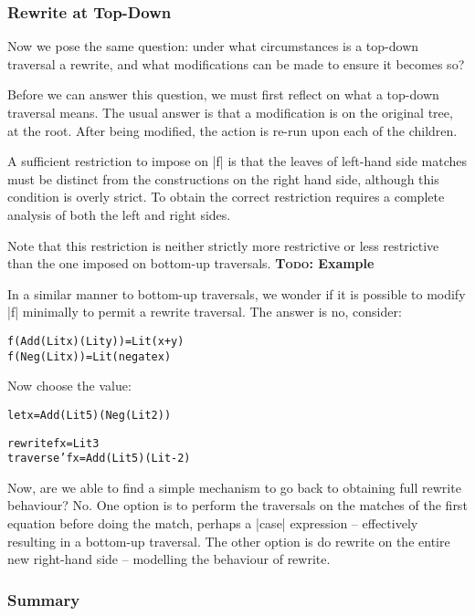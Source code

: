\documentclass[preprint]{sigplanconf}
\newcommand{\todo}[1]{\textbf{\textsc{Todo:} #1}}
\newenvironment{code}{\begin{alltt}\small}{\end{alltt}}
\begin{document}
\subsubsection{Rewrite at Top-Down}

Now we pose the same question: under what circumstances is a top-down traversal a rewrite, and what modifications can be made to ensure it becomes so?

Before we can answer this question, we must first reflect on what a top-down traversal means. The usual answer is that a modification is on the original tree, at the root. After being modified, the action is re-run upon each of the children.

A sufficient restriction to impose on |f| is that the leaves of left-hand side matches must be distinct from the constructions on the right hand side, although this condition is overly strict. To obtain the correct restriction requires a complete analysis of both the left and right sides.

Note that this restriction is neither strictly more restrictive or less restrictive than the one imposed on bottom-up traversals. \todo{Example}

In a similar manner to bottom-up traversals, we wonder if it is possible to modify |f| minimally to permit a rewrite traversal. The answer is no, consider:

\begin{code}
f (Add (Lit x) (Lit y)  ) = Lit (x+y)
f (Neg (Lit x)          ) = Lit (negate x)
\end{code}

Now choose the value:

\begin{code}
let x = Add (Lit 5) (Neg (Lit 2))

rewrite f x = Lit 3
traverse' f x = Add (Lit 5) (Lit -2)
\end{code}

Now, are we able to find a simple mechanism to go back to obtaining full rewrite behaviour? No. One option is to perform the traversals on the matches of the first equation before doing the match, perhaps a |case| expression -- effectively resulting in a bottom-up traversal. The other option is do rewrite on the entire new right-hand side -- modelling the behaviour of rewrite.


\subsubsection{Summary}
\end{document}
